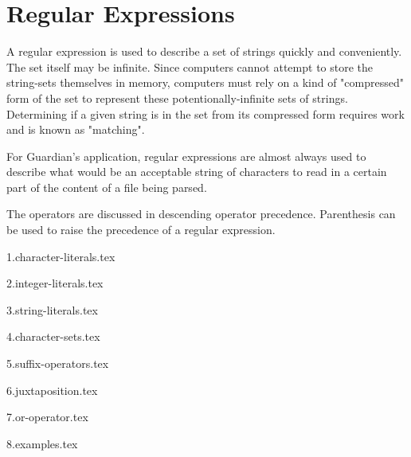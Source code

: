 
\section{Regular Expressions}
\label{sec:regex}
{
	A regular expression is used to describe a set of
	strings quickly and conveniently. The set itself may be infinite.
	Since computers cannot attempt to store the string-sets themselves in
	memory, computers must rely on a kind of "compressed" form of the set
	to represent
	these potentionally-infinite sets of strings. Determining if a given string
	is in the set from its compressed form requires work and is known
	as "matching".
	
	For Guardian's application, regular expressions are almost always used
	to describe what would be an acceptable string of characters to read in
	a certain part of the content of a file being parsed.
	
	The operators are discussed in descending operator precedence. Parenthesis
	can be used to raise the precedence of a regular expression.
	
	{1.character-literals.tex}
	
	{2.integer-literals.tex}
	
	{3.string-literals.tex}
	
	{4.character-sets.tex}
	
	{5.suffix-operators.tex}
	
	{6.juxtaposition.tex}
	
	{7.or-operator.tex}
	
	{8.examples.tex}
}

